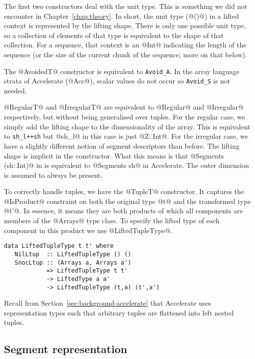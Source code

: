 The first two constructors deal with the unit type. This is something we did not encounter in Chapter~\ref{chap:theory}. In short, the unit type (@()@) in a lifted context is represented by the lifting shape. There is only one possible unit type, so a collection of elements of that type is equivalent to the shape of that collection. For a sequence, that context is an @Int@ indicating the length of the sequence (or the size of the current chunk of the sequence; more on that below).

The @AvoidedT@ constructor is equivalent to \lstinline[style=ndp]{Avoid_A}. In the array language strata of Accelerate (@Acc@), scalar values do not occur so \lstinline[style=ndp]{Avoid_S} is not needed.

@RegularT@ and @IrregularT@ are equivalent to @Regular@ and @Irregular@ respectively, but without being generalised over tuples. For the regular case, we simply add the lifting shape to the dimensionality of the array. This is equivalent to \lstinline[style=ndp]{sh_l++sh} but @sh_l@ in this case is just @Z:.Int@. For the irregular case, we have a slightly different notion of segment descriptors than before. The lifting shape is implicit in the constructor. What this means is that @Segments (sh:.Int)@ in \ndp{} is equivalent to @Segments sh@ in Accelerate. The outer dimension is assumed to always be present.

To correctly handle tuples, we have the @TupleT@ constructor. It captures the @IsProduct@ constraint on both the original type @t@ and the transformed type @t'@. In essence, it means they are both products of which all components are members of the @Arrays@ type class. To specify the lifted type of each component in this product we use @LiftedTupleType@.
%
\begin{lstlisting}
data LiftedTupleType t t' where
   NilLtup  :: LiftedTupleType () ()
   SnocLtup :: (Arrays a, Arrays a')
            => LiftedTupleType t t'
            -> LiftedType a a'
            -> LiftedTupleType (t,a) (t',a')
\end{lstlisting}
%
Recall from Section~\ref{sec:background-accelerate} that Accelerate uses representation types such that arbitrary tuples are flattened into left nested tuples.

\subsection{Segment representation}

